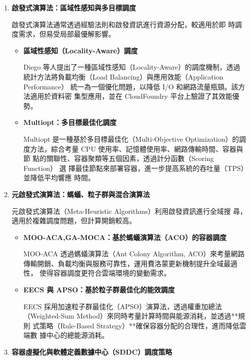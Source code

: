 \documentclass[12pt,a4paper]{article}
\begin{document}
\begin{enumerate}[label={(\zhdig*)}, leftmargin=2\parindent, listparindent=\parindent]
\begin{enumerate}[label={(\arabic*)}, leftmargin=\parindent, listparindent=\parindent]
\begin{enumerate}[label={(\arabic*)}, leftmargin=\parindent, listparindent=\parindent]

    \item \textbf{
啟發式演算法：區域性感知與多目標調度}

啟發式演算法通常透過經驗法則和啟發資訊進行資源分配，較適用於即
時調度需求，但易受局部最優解影響。
\begin{itemize}[leftmargin=\parindent, listparindent=\parindent]
    \item \textbf{
\cite{11} 區域性感知（Locality-Aware）調度}

Diego 等人提出了一種區域性感知（Locality-Aware）的調度機制，透過
統計方法將負載均衡（Load Balancing）與應用效能（Application Performance）
統一為一個優化問題，以降低 I/O 和網路流量瓶頸。該方法適用於資料密
集型應用，並在 CloudFoundry 平台上驗證了其效能優勢。
\item \textbf{
\cite{12} Multiopt：多目標最佳化調度
}

Multiopt 是一種基於多目標最佳化（Multi-Objective Optimization）的調
度方法，綜合考量 CPU 使用率、記憶體使用率、網路傳輸時間、容器與節
點的關聯性、容器聚類等五個因素，透過計分函數（Scoring Function） 選
擇最佳節點來部署容器，進一步提高系統的吞吐量（TPS）並降低平均響應
時間。

    \end{itemize}
    \item \textbf{
元啟發式演算法：螞蟻、粒子群與混合演算法
}

元啟發式演算法（Meta-Heuristic Algorithms）利用啟發資訊進行全域搜
尋，適用於複雜調度問題，但計算開銷較高。
\begin{itemize}[leftmargin=\parindent, listparindent=\parindent]
    \item \textbf{
\cite{13} MOO-ACA,GA-MOCA：基於螞蟻演算法（ACO）的容器調度}

MOO-ACA 透過螞蟻演算法（Ant Colony Algorithm, ACO）來考量網路
傳輸開銷、負載均衡與服務可靠性，運用費洛蒙更新機制提升全域最適性，
使得容器調度更符合雲端環境的變動需求。

    \item \textbf{
\cite{14} EECS 與 APSO：基於粒子群最佳化的能效調度
}

EECS 採用加速粒子群最佳化（APSO）演算法，透過權重加總法
（Weighted-Sum Method）來同時考量計算時間與能源消耗，並透過**規則
式策略（Rule-Based Strategy）**確保容器分配的合理性，進而降低雲端數
據中心的總能源消耗。

\end{itemize}
    \item \textbf{
容器虛擬化與軟體定義數據中心（SDDC）調度策略
}


\end{enumerate}
\end{enumerate}
\end{enumerate}
\end{document}
